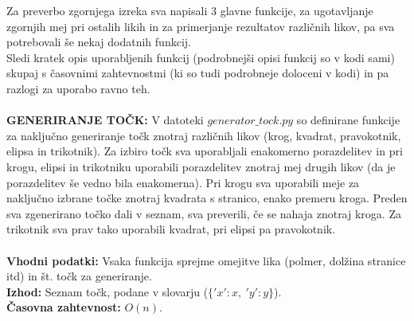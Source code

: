 \documentclass[a4paper]{article}
\begin{document}
Za preverbo zgornjega izreka sva napisali 3 glavne funkcije, za ugotavljanje zgornjih mej pri ostalih likih in za primerjanje rezultatov različnih likov, pa sva potrebovali še nekaj dodatnih funkcij. \\
Sledi kratek opis uporabljenih funkcij (podrobnejši opisi funkcij so v kodi sami) skupaj s časovnimi zahtevnostmi (ki so tudi podrobneje doloceni v kodi) in pa razlogi za uporabo ravno teh. \\ \\
\textbf{GENERIRANJE TOČK: } V datoteki \colorbox{gray!10}{$generator\_tock.py$} so definirane funkcije za naključno generiranje točk znotraj različnih likov (krog, kvadrat, pravokotnik, elipsa in trikotnik). Za izbiro točk sva uporabljali enakomerno porazdelitev in pri krogu, elipsi in trikotniku uporabili porazdelitev znotraj mej drugih likov (da je porazdelitev še vedno bila enakomerna). Pri krogu sva uporabili meje za naključno izbrane točke znotraj kvadrata s stranico, enako premeru kroga. Preden sva zgenerirano točko dali v seznam, sva preverili, če se nahaja znotraj kroga. Za trikotnik sva prav tako uporabili kvadrat, pri elipsi pa pravokotnik.\\ \\
\textbf{Vhodni podatki:} Vsaka funkcija sprejme omejitve lika (polmer, dolžina stranice itd) in št. točk za generiranje. \\ 
\textbf{Izhod:} Seznam točk, podane v slovarju ($\{'x' : x, \ 'y' :  y\}$).  \\ 
\textbf{Časovna zahtevnost:} $O(n).$\\ \\
\end{document}
